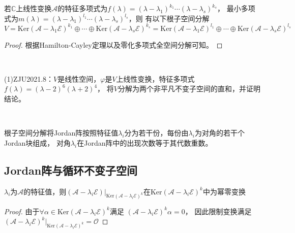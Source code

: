 \begin{theorem}
  若$\mathbb{C}$上线性变换$\mathcal{A}$的特征多项式为$f(\lambda) = (\lambda - \lambda_1)^{k_1} \cdots (\lambda - \lambda_s)^{k_s}$，
  最小多项式为$m(\lambda )= (\lambda - \lambda_1)^{l_1} \cdots (\lambda - \lambda_s)^{l_s}$，则
  有以下根子空间分解
  \begin{equation*}
    V = \mathrm{Ker}(\mathcal{A} - \lambda_1 \mathcal{E})^{k_1}\oplus \cdots \oplus \mathrm{Ker}(\mathcal{A} - \lambda_s \mathcal{E})^{k_s} = \mathrm{Ker}(\mathcal{A} - \lambda_1 \mathcal{E})^{l_1} \oplus \cdots \oplus \mathrm{Ker}(\mathcal{A} - \lambda_s \mathcal{E})^{l_s}
  \end{equation*}
\end{theorem}

\begin{proof}
  根据Hamilton-Cayley定理以及零化多项式全空间分解可知。
\end{proof}

~

\begin{exercise}
  (1)ZJU2021.8：$V$是线性空间，$\varphi$是$V$上线性变换，特征多项式$f(\lambda) = (\lambda - 2)^6(\lambda + 2)^4$，
  将$V$分解为两个非平凡不变子空间的直和，并证明结论。
\end{exercise}

~

\begin{theorem}[根子空间分解与Jordan标准型]
  根子空间分解将Jordan阵按照特征值$\lambda_i$分为若干份，每份由$\lambda_i$为对角的若干个Jordan块组成，
  对角$\lambda_i$在Jordan阵中的出现次数等于其代数重数。
\end{theorem}


\subsection{Jordan阵与循环不变子空间}

\begin{lemma}[核限制变换是幂零变换]
  $\lambda_i$为$\mathcal{A}$的特征值，则$(\mathcal{A} - \lambda_i \mathcal{E}) \big|_{\mathrm{Ker}(\mathcal{A} - \lambda_i \mathcal{E})^k}$在$\mathrm{Ker}(\mathcal{A} - \lambda_i \mathcal{E})^k$中为幂零变换
\end{lemma}

\begin{proof}
  由于$\forall \alpha \in \mathrm{Ker}(\mathcal{A} - \lambda_i \mathcal{E})^k $满足
  $(\mathcal{A} - \lambda_i\mathcal{E})^k \alpha = 0$，
  因此限制变换满足$(\mathcal{A} - \lambda_i\mathcal{E})^k\big|_{\mathrm{Ker}(\mathcal{A} - \lambda_i\mathcal{E})^k} = \mathcal{O}$
\end{proof}

